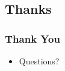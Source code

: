 \documentclass{beamer}
\begin{document}
\subsection{Thanks}
\begin{frame}
  \frametitle{Thank You}
  \begin{itemize}
    \item Questions?
  \end{itemize}
\end{frame}


%
%
%
%
%
%
%
%
\end{document}
